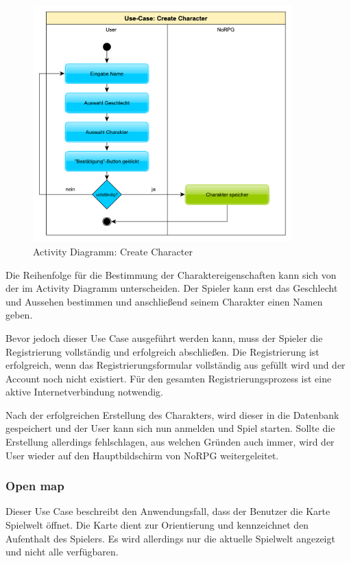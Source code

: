 			\begin{figure}[htbp]
				\centering 
				\label{createCharakter}
				\includegraphics[width=10cm]{pics/CreateCharacter.pdf}
				\caption{Activity Diagramm: Create Character}
			\end{figure}
		
			Die Reihenfolge für die Bestimmung der Charaktereigenschaften kann sich von der im Activity Diagramm unterscheiden. Der Spieler kann erst das Geschlecht und Aussehen bestimmen und anschließend seinem Charakter einen Namen geben.
	
			Bevor jedoch dieser Use Case ausgeführt werden kann, muss der Spieler die Registrierung vollständig und erfolgreich abschließen. Die Registrierung ist erfolgreich, wenn das Registrierungsformular vollständig aus gefüllt wird und der Account noch nicht existiert. Für den gesamten Registrierungsprozess ist eine aktive Internetverbindung notwendig.
			
			Nach der erfolgreichen Erstellung des Charakters, wird dieser in die Datenbank gespeichert und der User kann sich nun anmelden und Spiel starten. Sollte die Erstellung allerdings fehlschlagen, aus welchen Gründen auch immer, wird der User wieder auf den Hauptbildschirm von NoRPG weitergeleitet.
			
		\subsubsection{Open map}
			Dieser Use Case beschreibt den Anwendungsfall, dass der Benutzer die Karte Spielwelt öffnet. Die Karte dient zur Orientierung und kennzeichnet den Aufenthalt des Spielers. Es wird allerdings nur die aktuelle Spielwelt angezeigt und nicht alle verfügbaren.
			

